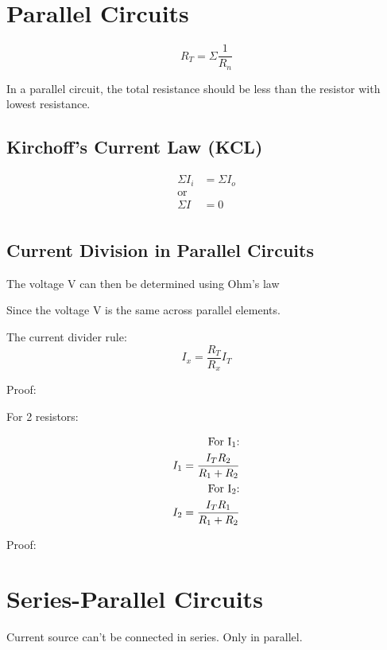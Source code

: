\documentclass[openany]{book}
\begin{document}
\chapter{Parallel Circuits}

\begin{equation*}
    R_T = \Sigma \frac{1}{R_n}
\end{equation*}

In a parallel circuit, the total resistance should be less than the resistor with lowest resistance. 

\section{Kirchoff's Current Law (KCL)}

\begin{align*}
    \Sigma I_i &= \Sigma I_o \\
    \text{or} \\
    \Sigma I &= 0 \\
\end{align*}

\section{Current Division in Parallel Circuits}

The voltage V can then be determined using Ohm’s law

Since the voltage V is the same across parallel elements.

The current divider rule:
\[I_x=\frac{R_T}{R_x}I_T\]

Proof:



For 2 resistors:

\begin{align*}
    \text{For I\textsubscript{1}:} \\ I_1 = \frac{I_TR_2}{R_1+R_2} \\
    \text{For I\textsubscript{2}:} \\ I_2 = \frac{I_TR_1}{R_1+R_2} \\
\end{align*}

Proof:

\chapter{Series-Parallel Circuits}

Current source can't be connected in series. Only in parallel. 
\end{document}
